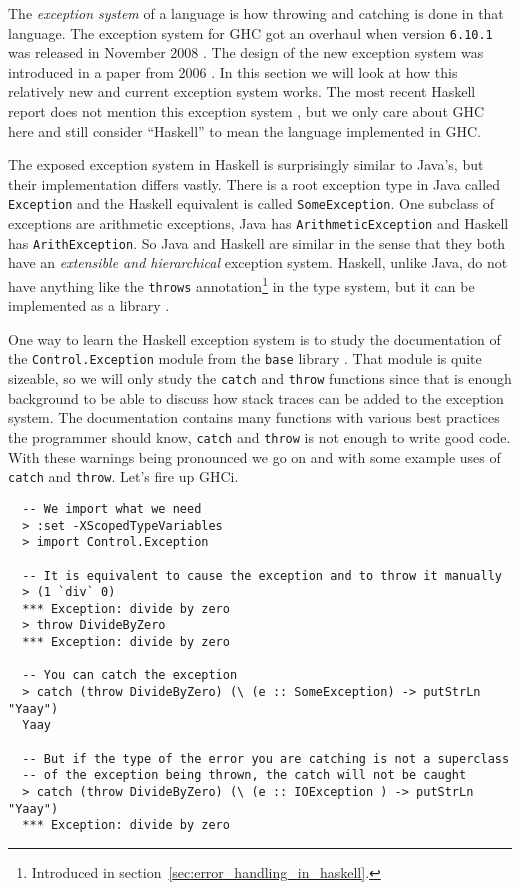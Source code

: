 The \emph{exception system} of a language is how throwing and catching
is done in that language. The exception system for GHC got an
overhaul when version \texttt{6.10.1} was released in November 2008
\cite{haskell_org_release_6.10.1}. The design of the new exception
system was introduced in a paper from 2006 \cite{marlow2006extensible}.
In this section we will look at how this relatively new and current
exception system works. The most recent Haskell report does not mention
this exception system \cite[ch. 42]{haskell_report2010}, but we only
care about GHC here and still consider ``Haskell'' to mean the language
implemented in GHC.

The exposed exception system in Haskell is surprisingly similar to
Java's, but their implementation differs vastly.
There is a root exception type in Java called \texttt{Exception}
and the Haskell equivalent is called \texttt{SomeException}. One
subclass of exceptions are arithmetic exceptions, Java has
\texttt{ArithmeticException} and Haskell has \texttt{ArithException}.
So Java and Haskell are similar in the sense that they both have an
\emph{extensible and hierarchical} exception system.  Haskell, unlike
Java, do not have anything like the \texttt{throws}
annotation\footnote{Introduced in section~\ref{sec:error_handling_in_haskell}.}
in the type system, but it can be implemented as a library
\cite{github_pepeiborra_cme, hackage_control_monad_exception}.

One way to learn the Haskell exception system is to study the
documentation of the \texttt{Control.Exception} module from the
\texttt{base} library \cite{hackage_base_control_exception}.
That module is quite sizeable, so
we will only study the \texttt{catch} and \texttt{throw} functions since
that is enough background to be able to discuss how stack traces can be added
to the exception system. The documentation contains many functions with various best practices
the programmer should know, \texttt{catch} and
\texttt{throw} is not enough to write good code. With
these warnings being pronounced we go on and with some example
uses of \texttt{catch} and \texttt{throw}. Let's fire up GHCi.

\begin{verbatim}
  -- We import what we need
  > :set -XScopedTypeVariables
  > import Control.Exception

  -- It is equivalent to cause the exception and to throw it manually
  > (1 `div` 0)
  *** Exception: divide by zero
  > throw DivideByZero
  *** Exception: divide by zero

  -- You can catch the exception
  > catch (throw DivideByZero) (\ (e :: SomeException) -> putStrLn "Yaay")
  Yaay

  -- But if the type of the error you are catching is not a superclass
  -- of the exception being thrown, the catch will not be caught
  > catch (throw DivideByZero) (\ (e :: IOException ) -> putStrLn "Yaay")
  *** Exception: divide by zero
\end{verbatim}

